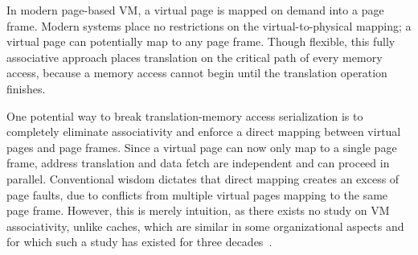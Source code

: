 In modern page-based VM, a virtual page is mapped on demand into a page frame. Modern systems place no restrictions on the virtual-to-physical mapping; a virtual page can potentially map to any page frame. Though flexible, this fully associative approach places translation on the critical path of every memory access, because a memory access cannot begin until the translation operation finishes.

One potential way to break translation-memory access serialization is to completely eliminate associativity and enforce a direct mapping between virtual pages and page frames. Since a virtual page can now only map to a single page frame, address translation and data fetch are independent and can proceed in parallel. Conventional wisdom dictates that direct mapping creates an excess of page faults, due to conflicts from multiple virtual pages mapping to the same page frame. However, this is merely intuition, as there exists no study on VM associativity, unlike caches, which are similar in some organizational aspects and for which such a study has existed for three decades~\cite{hill:aspects}. 

